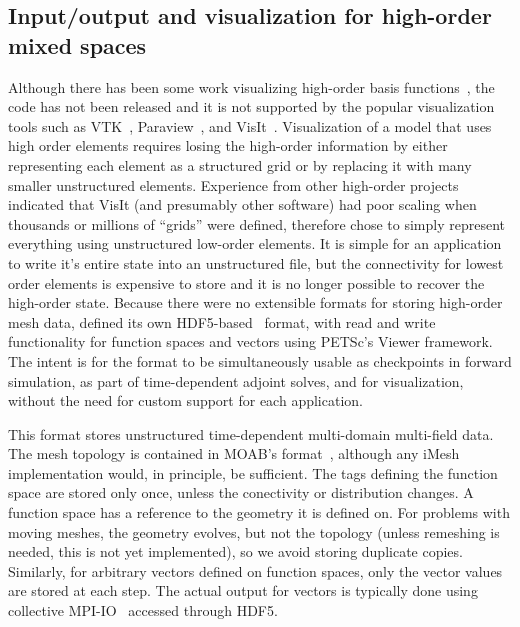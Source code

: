 \subsection{Input/output and visualization for high-order mixed spaces}
Although there has been some work visualizing high-order basis functions~\cite{schroeder2005framework,schroeder2006methods,ueffinger2010interactive}, the code has not been released and it is not supported by the popular visualization tools such as VTK~\cite{schroeder1998visualization}, Paraview~\cite{henderson2004paraview}, and VisIt~\cite{childs2006beyond}.
Visualization of a model that uses high order elements requires losing the high-order information by either representing each element as a structured grid or by replacing it with many smaller unstructured elements.
Experience from other high-order projects~\cite{fischer2008nek5000} indicated that VisIt (and presumably other software) had poor scaling when thousands or millions of ``grids'' were defined, therefore {\Dohp} chose to simply represent everything using unstructured low-order elements.
It is simple for an application to write it's entire state into an unstructured file, but the connectivity for lowest order elements is expensive to store and it is no longer possible to recover the high-order state.
Because there were no extensible formats for storing high-order mesh data, {\Dohp} defined its own HDF5-based~\cite{hdf5} format, with read and write functionality for function spaces and vectors using PETSc's Viewer framework.
The intent is for the format to be simultaneously usable as checkpoints in forward simulation, as part of time-dependent adjoint solves, and for visualization, without the need for custom support for each application.

This format stores unstructured time-dependent multi-domain multi-field data.
The mesh topology is contained in MOAB's format~\cite{moab}, although any iMesh implementation would, in principle, be sufficient.
The tags defining the function space are stored only once, unless the conectivity or distribution changes.
A function space has a reference to the geometry it is defined on.
For problems with moving meshes, the geometry evolves, but not the topology (unless remeshing is needed, this is not yet implemented), so we avoid storing duplicate copies.
Similarly, for arbitrary vectors defined on function spaces, only the vector values are stored at each step.
The actual output for vectors is typically done using collective MPI-IO~\cite{corbett1995overview} accessed through HDF5.

